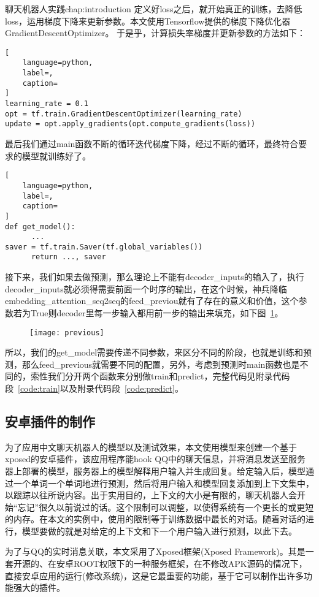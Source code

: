 \begin{cuzchapter}{聊天机器人实践}{chap:introduction}
定义好loss之后，就开始真正的训练，去降低loss，运用梯度下降来更新参数。本文使用Tensorflow提供的梯度下降优化器GradientDescentOptimizer。
于是乎，计算损失率梯度并更新参数的方法如下：
\begin{lstlisting}[
    language=python,
    label=,
    caption=
]
learning_rate = 0.1
opt = tf.train.GradientDescentOptimizer(learning_rate)
update = opt.apply_gradients(opt.compute_gradients(loss))
\end{lstlisting}

最后我们通过main函数不断的循环迭代梯度下降，经过不断的循环，最终符合要求的模型就训练好了。
\begin{lstlisting}[
    language=python,
    label=,
    caption=
]
def get_model():
      ...
saver = tf.train.Saver(tf.global_variables())
      return ..., saver
\end{lstlisting}

接下来，我们如果去做预测，那么理论上不能有decoder\_inputs的输入了，执行decoder\_inputs就必须得需要前面一个时序的输出，在这个时候，神兵降临embedding\_attention\_seq2seq的feed\_previou就有了存在的意义和价值，这个参数若为True则decoder里每一步输入都用前一步的输出来填充，如下图~\ref{previous}。
\begin{figure}[!htbp]
    \centering
    \texttt{[image: previous]}
    \caption[previous]{}
    \label{previous}
\end{figure}

所以，我们的get\_model需要传递不同参数，来区分不同的阶段，也就是训练和预测，那么feed\_previous就需要不同的配置，另外，考虑到预测时main函数也是不同的，索性我们分开两个函数来分别做train和predict，完整代码见附录代码段~\ref{code:train}以及附录代码段~\ref{code:predict}。
\subsection{安卓插件的制作}\label{sec:background}
为了应用中文聊天机器人的模型以及测试效果，本文使用模型来创建一个基于xposed的安卓插件，该应用程序能hook QQ中的聊天信息，并将消息发送至服务器上部署的模型，服务器上的模型解释用户输入并生成回复。给定输入后，模型通过一个单词一个单词地进行预测，然后将用户输入和模型回复添加到上下文集中，以跟踪以往所说内容。出于实用目的，上下文的大小是有限的，聊天机器人会开始“忘记”很久以前说过的话。这个限制可以调整，以使得系统有一个更长的或更短的内存。在本文的实例中，使用的限制等于训练数据中最长的对话。随着对话的进行，模型要做的就是对给定的上下文和下一个用户输入进行预测，以此下去。

为了与QQ的实时消息关联，本文采用了Xposed框架(Xposed Framework)。其是一套开源的、在安卓ROOT权限下的一种服务框架，在不修改APK源码的情况下，直接安卓应用的运行(修改系统)，这是它最重要的功能，基于它可以制作出许多功能强大的插件。


\end{cuzchapter}
